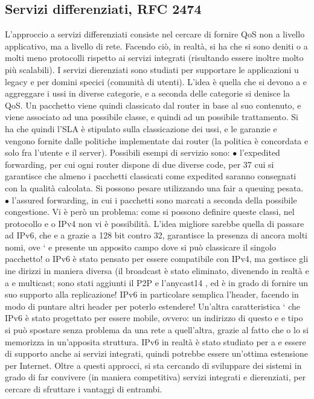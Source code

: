 \subsection{Servizi differenziati, RFC 2474}
L'approccio a servizi differenziati consiste nel cercare di fornire QoS non a livello
applicativo, ma a livello di rete. Facendo ciò, in realtà, si ha che si sono deniti
o
a
molti meno protocolli rispetto ai servizi integrati (risultando essere inoltre molto
più scalabili). I servizi dierenziati sono studiati per supportare le applicazioni
u
legacy e per domini specici (comunità di utenti). L'idea è quella che si devono
a
e
aggreggare i ussi in diverse categorie, e a seconda delle categorie si denisce la
QoS. Un pacchetto viene quindi classicato dal router in base al suo contenuto,
e viene associato ad una possibile classe, e quindi ad un possibile trattamento.
Si ha che quindi l'SLA è stipulato sulla classicazione dei ussi, e le garanzie
e
vengono fornite dalle politiche implementate dai router (la politica è concordata
e
solo fra l'utente e il server).
Possibili esempi di servizio sono:
$\bullet$ l'expedited forwarding, per cui ogni router dispone di due diverse code, per
37
cui si garantisce che almeno i pacchetti classicati come expedited saranno
consegnati con la qualità calcolata. Si possono pesare utilizzando una fair
a
queuing pesata.
$\bullet$ l'assured forwarding, in cui i pacchetti sono marcati a seconda della possibile congestione.
Vi è però un problema: come si possono definire queste classi, nel protocollo
e
o
IPv4 non vi è possibilità. L'idea migliore sarebbe quella di passare ad IPv6, che
e
a
grazie a 128 bit contro 32, garantisce la presenza di ancora molti nomi, ove `
e
presente un apposito campo dove si può classicare il singolo pacchetto!
o
IPv6 è stato pensato per essere compatibile con IPv4, ma gestisce gli ine
dirizzi in maniera diversa (il broadcast è stato eliminato, divenendo in realtà
e
a
e
multicast; sono stati aggiunti il P2P e l'anycast14 , ed è in grado di fornire un
suo supporto alla replicazione! IPv6 in particolare semplica l'header, facendo
in modo di puntare altri header per poterlo estendere! Un'altra caratteristica
` che IPv6 è stato progettato per essere mobile, ovvero: un indirizzo di questo
e
e
tipo si può spostare senza problema da una rete a quell'altra, grazie al fatto che
o
lo si memorizza in un'apposita struttura. IPv6 in realtà è stato studiato per
a e
essere di supporto anche ai servizi integrati, quindi potrebbe essere un'ottima
estensione per Internet.
Oltre a questi approcci, si sta cercando di sviluppare dei sistemi in grado
di far convivere (in maniera competitiva) servizi integrati e dierenziati, per
cercare di sfruttare i vantaggi di entrambi.
